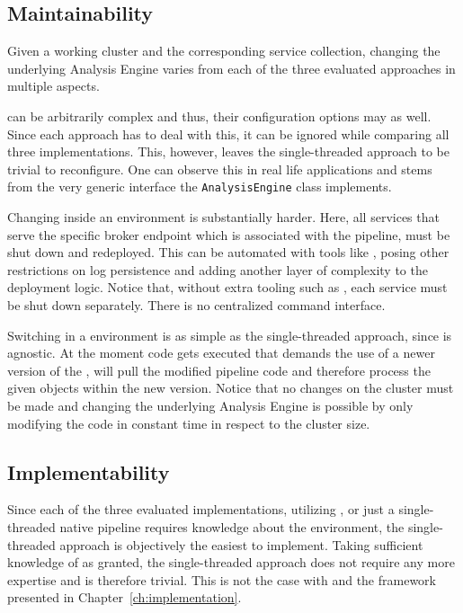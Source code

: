 \subsection{Maintainability}
Given a working \spark{} cluster and the corresponding \uimaas{} service collection, changing the underlying Analysis Engine varies from each of the three evaluated approaches in multiple aspects. 

\anens{} can be arbitrarily complex and thus, their configuration options may as well. Since each approach has to deal with this, it can be ignored while comparing all three implementations. This, however, leaves the single-threaded approach to be trivial to reconfigure. One can observe this in real life applications and stems from the very generic interface the \lstinline|AnalysisEngine| class implements.

Changing \anens{} inside an \uimaas{} environment is substantially harder. Here, all services that serve the specific broker endpoint which is associated with the pipeline, must be shut down and redeployed. This can be automated with tools like \docker{}, posing other restrictions on log persistence and adding another layer of complexity to the deployment logic. Notice that, without extra tooling such as \docker{}, each service must be shut down separately. There is no centralized command interface.

Switching \anens{} in a \spark{} environment is as simple as the single-threaded approach, since \spark{} is \uima{} agnostic. At the moment code gets executed that demands the use of a newer version of the \anen{}, \spark{} will pull the modified pipeline code and therefore process the given \cas{} objects within the new \anen{} version. Notice that no changes on the cluster must be made and changing the underlying Analysis Engine is possible by only modifying the code in constant time in respect to the cluster size.
\subsection{Implementability}
Since each of the three evaluated implementations, utilizing \spark{}, \uimaas{} or just a single-threaded native \uima{} pipeline requires knowledge about the \uima{} environment, the single-threaded approach is objectively the easiest to implement. Taking sufficient knowledge of \uima{} as granted, the single-threaded approach does not require any more expertise and is therefore trivial. This is not the case with \uimaas{} and the framework presented in Chapter~\ref{ch:implementation}.

